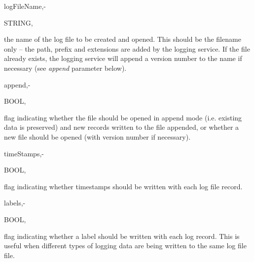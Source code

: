 \hfill
\begin{minipage}{\dimexpr\textwidth-2em}

        \medskip
        \begin{minipage}[t][][b]{9.5em}logFileName,\hfill{-}\end{minipage}
        \begin{minipage}[t][][b]{5.5em}STRING,\hfill\end{minipage}
        \begin{minipage}[t][][b]{\dimexpr\textwidth-15.5em}
            the name of the log file to be created and opened. This should be the filename only -- the path, prefix and extensions are added by the logging service. If the file already exists, the logging service will append a version number to the name if necessary (see \textit{append} parameter below).
        \end{minipage}\vfill

        \medskip
        \begin{minipage}[t][][b]{9.5em}append,\hfill{-}\end{minipage}
        \begin{minipage}[t][][b]{5.5em}BOOL,\hfill\end{minipage}
        \begin{minipage}[t][][b]{\dimexpr\textwidth-15.5em}
            flag indicating whether the file should be opened in append mode (i.e. existing data is preserved) and new records written to the file appended, or whether a new file should be opened (with version number if necessary).
        \end{minipage}\vfill

        \medskip
        \begin{minipage}[t][][b]{9.5em}timeStamps,\hfill{-}\end{minipage}
        \begin{minipage}[t][][b]{5.5em}BOOL,\hfill\end{minipage}
        \begin{minipage}[t][][b]{\dimexpr\textwidth-15.5em}
            flag indicating whether timestamps should be written with each log file record.
        \end{minipage}\vfill

        \medskip
        \begin{minipage}[t][][b]{9.5em}labels,\hfill{-}\end{minipage}
        \begin{minipage}[t][][b]{5.5em}BOOL,\hfill\end{minipage}
        \begin{minipage}[t][][b]{\dimexpr\textwidth-15.5em}
            flag indicating whether a label should be written with each log record. This is useful when different types of logging data are being written to the same log file file.
        \end{minipage}\vfill


\end{minipage}
